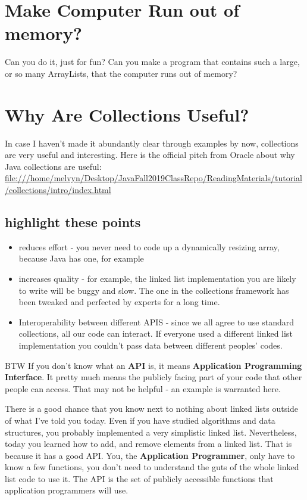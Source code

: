 \documentclass[12pt]{article}
\begin{document}
\section{Make Computer Run out of memory?}
Can you do it, just for fun? Can you make a program that contains such a large, or so many ArrayLists, that the computer runs out of memory?


\section{Why Are Collections Useful?}
In case I haven't made it abundantly clear through examples by now, collections are very useful and interesting. Here is the official pitch from Oracle about why Java collections are useful:
\url{file:///home/melvyn/Desktop/JavaFall2019ClassRepo/ReadingMaterials/tutorial/collections/intro/index.html}

\subsection{highlight these points}
\begin{itemize}
\item reduces effort - you never need to code up a dynamically resizing array, because Java has one, for example
\item increases quality - for example, the linked list implementation you are likely to write will be buggy and slow. The one in the collections framework has been tweaked and perfected by experts for a long time.
\item Interoperability between different APIS - since we all agree to use standard collections, all our code can interact. If everyone used a different linked list implementation you couldn't pass data between different peoples' codes.
\end{itemize}

BTW If you don't know what an \textbf{API} is, it means \textbf{Application Programming Interface}. It pretty much means the publicly facing part of your code that other people can access. That may not be helpful - an example is warranted here.

There is a good chance that you know next to nothing about linked lists outside of what I've told you today. Even if you have studied algorithms and data structures, you probably implemented a very simplistic linked list. Nevertheless, today you learned how to add, and remove elements from a linked list. That is because it has a good API. You, the \textbf{Application Programmer}, only have to know a few functions, you don't need to understand the guts of the whole linked list code to use it. The API is the set of publicly accessible functions that application programmers will use.
\end{document}

